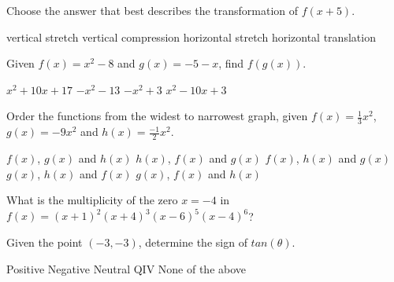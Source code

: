 \documentclass[addpoints]{exam}
\begin{document}
\begin{questions}
    \question[1] Choose the answer that best describes the transformation of $f(x+5)$.
    
    \begin{oneparchoices}
        \choice vertical stretch
        \choice vertical compression
        \choice horizontal stretch
        \choice horizontal translation
        \end{oneparchoices}  \answerline
    
    \question[1] Given $f(x) = x^2 - 8$ and $g(x) = -5 - x$, find $f(g(x))$.
    
    \begin{oneparchoices}
        \choice $x^2 + 10x + 17$
        \choice $-x^2 - 13$
        \choice $-x^2 + 3$
        \choice $x^2 - 10x + 3$
        \end{oneparchoices}  \answerline
    
    
    \question[1] Order the functions from the widest to narrowest graph, given $f(x) = \frac{1}{3}x^2$, $g(x) = -9x^2$ and $h(x) = \frac{-1}{2}x^2$.
    
    \begin{oneparchoices}
        \choice $f(x)$, $g(x)$ and $h(x)$
        \choice $h(x)$, $f(x)$ and $g(x)$
        \choice $f(x)$, $h(x)$ and $g(x)$
        \choice $g(x)$, $h(x)$ and $f(x)$
        \choice $g(x)$, $f(x)$ and $h(x)$
        \end{oneparchoices}  \answerline
        \newpage
    
    \question[1] What is the multiplicity of the zero $x = -4$ in $f(x) = (x+1)^2 (x+4)^3 (x-6)^5 (x-4)^6$?
    
    \begin{oneparchoices}
        \end{oneparchoices}  \answerline
    
    \question[1] Given the point $(-3, -3)$, determine the sign of $tan(\theta)$.
    
    \begin{oneparchoices}
        \choice Positive
        \choice Negative
        \choice Neutral
        \choice QIV
        \choice None of the above
        \end{oneparchoices}  \answerline
    

\end{questions}
\end{document}
